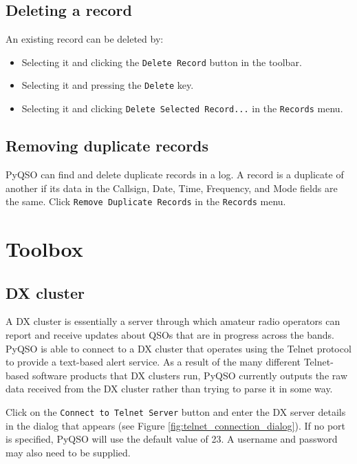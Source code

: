 \documentclass[11pt, a4paper]{report}
\begin{document}
\section{Deleting a record}
An existing record can be deleted by:
\begin{itemize}
  \item Selecting it and clicking the \texttt{Delete Record} button in the toolbar.
  \item Selecting it and pressing the \texttt{Delete} key.
  \item Selecting it and clicking \texttt{Delete Selected Record...} in the \texttt{Records} menu.
\end{itemize}

\section{Removing duplicate records}
PyQSO can find and delete duplicate records in a log. A record is a duplicate of another if its data in the Callsign, Date, Time, Frequency, and Mode fields are the same. Click \texttt{Remove Duplicate Records} in the \texttt{Records} menu.

\chapter{Toolbox}\label{chap:toolbox}

\section{DX cluster}
A DX cluster is essentially a server through which amateur radio operators can report and receive updates about QSOs that are in progress across the bands. PyQSO is able to connect to a DX cluster that operates using the Telnet protocol to provide a text-based alert service. As a result of the many different Telnet-based software products that DX clusters run, PyQSO currently outputs the raw data received from the DX cluster rather than trying to parse it in some way.


Click on the \texttt{Connect to Telnet Server} button and enter the DX server details in the dialog that appears (see Figure \ref{fig:telnet_connection_dialog}). If no port is specified, PyQSO will use the default value of 23. A username and password may also need to be supplied.
\end{document}
